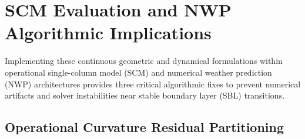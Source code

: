 \section{SCM Evaluation and NWP Algorithmic Implications}
\label{sec:scm_nwp_implications}

Implementing these continuous geometric and dynamical formulations within operational single-column model (SCM) and numerical weather prediction (NWP) architectures provides three critical algorithmic fixes to prevent numerical artifacts and solver instabilities near stable boundary layer (SBL) transitions.

\subsection{Operational Curvature Residual Partitioning}

